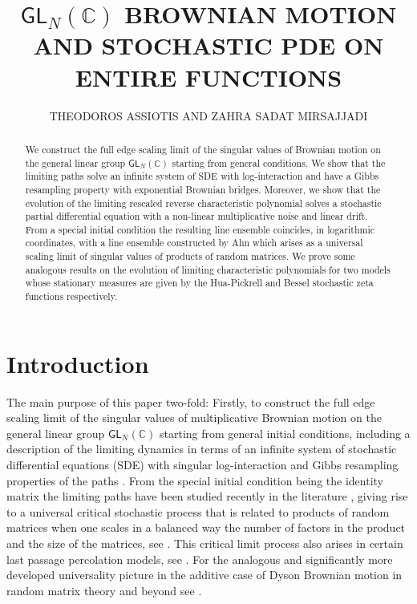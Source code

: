 \documentclass[]{article}
\title{\large \bf $\mathsf{GL}_N(\mathbb{C})$ BROWNIAN MOTION AND STOCHASTIC PDE ON ENTIRE FUNCTIONS}
\author{\small THEODOROS ASSIOTIS AND ZAHRA SADAT MIRSAJJADI}
\date{}
\begin{document}
\maketitle

\begin{abstract} 
We construct the full edge scaling limit of the singular values of Brownian motion on the general linear group $\mathsf{GL}_N(\mathbb{C})$ starting from general conditions. We show that the limiting paths solve an infinite system of SDE with log-interaction and have a Gibbs resampling property with exponential Brownian bridges. Moreover, we show that the evolution of the limiting rescaled reverse characteristic polynomial solves a stochastic partial differential equation with a non-linear multiplicative noise and linear drift. From a special initial condition the resulting line ensemble coincides, in logarithmic coordinates, with a line ensemble constructed by Ahn which arises as a universal scaling limit of singular values of products of random matrices. We prove some analogous results on the evolution of limiting characteristic polynomials for two models whose stationary measures are given by the Hua-Pickrell and Bessel stochastic zeta functions respectively.
\end{abstract}

\tableofcontents
{} 






\section{Introduction}



The main purpose of this paper two-fold: Firstly, to construct the full edge scaling limit of the singular values of multiplicative Brownian motion on the general linear group $\mathsf{GL}_N(\mathbb{C})$ \cite{NorrisRogersWilliams,Biane,JonesOConnell,IpsenSchomerus} starting from general initial conditions, including a description of the limiting dynamics in terms of an infinite system of stochastic differential equations (SDE) \cite{Tsai,Osada1,Osada2,Osada3,OsadaTanemura} with singular log-interaction and Gibbs resampling properties of the paths \cite{CorwinHammond1,CorwinHammond2,DimitrovCorwinBarraquand,DimitrovMatetski,CalvertHammondHegde,DauvergneVirag,XuanWuBessel}. From the special initial condition being the identity matrix the limiting paths have been studied recently in the literature \cite{Ahn, Mustazee}, giving rise to a universal critical stochastic process that is related to products of random matrices \cite{BougerolLacroix,AkemannKieburgWei,AkemannIpsen,KuijlaarsZhang,KuijlaarsStivigny} when one scales in a balanced way the number of factors in the product and the size of the matrices, see \cite{Akemann2019integrable,AkemannUniversality,Ahn,LiuWangWang,AkemannByun,BerezinStrahovGap}. This critical limit process also arises in certain last passage percolation models, see \cite{BerezinStrahov}. For the analogous and significantly more developed universality picture in the additive case of Dyson Brownian motion \cite{Dyson} in random matrix theory and beyond see \cite{ErdosYau,CorwinKPZ}.
\end{document}
